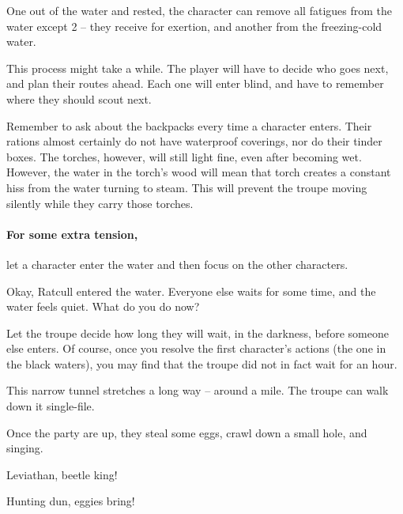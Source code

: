 \begin{multicols}{2}
One out of the water and rested, the character can remove all \glspl{fatigue} from the water except 2 -- they receive  for exertion, and another from the freezing-cold water.

This process might take a while.
The player will have to decide who goes next, and plan their routes ahead.
Each one will enter blind, and have to remember where they should scout next.

Remember to ask about the backpacks every time a character enters.
Their rations almost certainly do not have waterproof coverings, nor do their tinder boxes.
The torches, however, will still light fine, even after becoming wet.
However, the water in the torch's wood will mean that torch creates a constant hiss from the water turning to steam.
This will prevent the troupe moving silently while they carry those torches.

\paragraph{For some extra tension,}
let a character enter the water and then focus on the other characters.

\begin{speechtext}
  Okay, Ratcull entered the water.
  Everyone else waits for some time, and the water feels quiet.
  What do you do now?
\end{speechtext}

Let the troupe decide how long they will wait, in the darkness, before someone else enters.
Of course, once you resolve the first character's actions (the one in the black waters), you may find that the troupe did not in fact wait for an hour.


This narrow tunnel stretches a long way -- around a mile.
The troupe can walk down it single-file.



Once the party are up, they steal some eggs, crawl down a small hole, and singing.

\begin{speechtext}
  Leviathan, beetle king!

  \noindent
  Hunting dun, eggies bring!
\end{speechtext}



\end{multicols}
